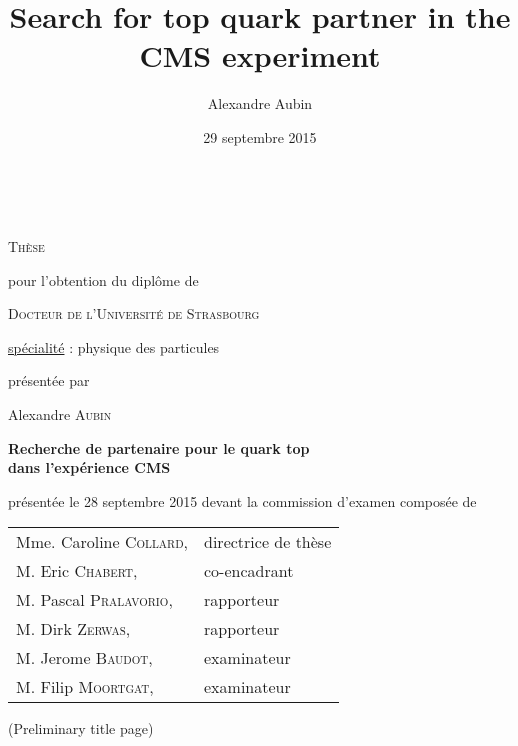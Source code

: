 


\title{Search for top quark partner in the CMS experiment}
\author{Alexandre Aubin}
\date{29 septembre 2015}

\begin{titlepage}
    \vspace*{1cm}
    \begin{center}
        \\

        \vspace*{0.8cm}

        {\Large \textsc{Thèse}}

        \vspace*{0.8cm}

        pour l'obtention du diplôme de

        \vspace*{0.8cm}

        {\Large \textsc{Docteur de l'Université de Strasbourg}}

        \vspace*{0.8cm}

        \underline{spécialité} : physique des particules

        \vspace*{0.8cm}

        présentée par

        Alexandre \textsc{Aubin}

        \vspace*{0.8cm}

        {\Large \textbf{Recherche de partenaire pour le quark top\\ dans l'expérience CMS}}

        \vspace*{0.8cm}

        présentée le 28 septembre 2015 devant la commission d'examen composée de

        \vspace*{0.8cm}

        \begin{tabular}{ll}
            Mme. Caroline \textsc{Collard}, & directrice de thèse\\
            M. Eric \textsc{Chabert},       & co-encadrant\\
            M. Pascal \textsc{Pralavorio},  & rapporteur\\
            M. Dirk \textsc{Zerwas},        & rapporteur\\
            M. Jerome \textsc{Baudot},      & examinateur\\
            M. Filip \textsc{Moortgat},     & examinateur\\
        \end{tabular}

        \vspace*{0.5cm}

        \Huge{(Preliminary title page)}

    \end{center}
    \vspace*{1cm}
\end{titlepage}
\restoregeometry
